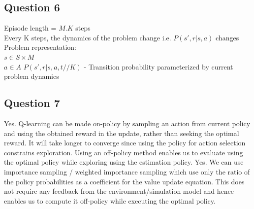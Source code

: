 \documentclass[12pt]{extarticle}
\begin{document}
\subsection{Question 6}
Episode length = $M.K$ steps\\
Every K steps, the dynamics of the problem change i.e. $P(s',r|s,a)$ changes\\
Problem representation:\\
$s \in S \times M$\\
$a \in A$
$P(s',r|s,a,t//K)$ - Transition probability parameterized by current problem dynamics

\subsection{Question 7}
Yes. Q-learning can be made on-policy by sampling an action from current policy and using the obtained reward in the update, rather than seeking the optimal reward. It will take longer to converge since using the policy for action selection constrains exploration. Using an off-policy method enables us to evaluate using the optimal policy while exploring using the estimation policy.
Yes. We can use importance sampling / weighted importance sampling which use only the ratio of the policy probabilities as a coefficient for the value update equation. This does not require any feedback from the environment/simulation model and hence enables us to compute it off-policy while executing the optimal policy.
\end{document}
